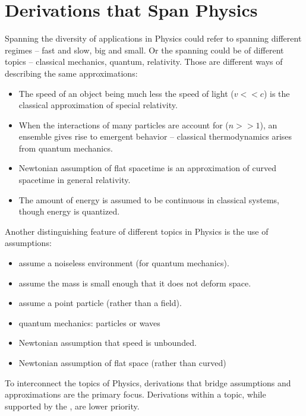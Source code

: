\section{Derivations that Span Physics\label{sec:span_physics}}

Spanning the diversity of applications in Physics  could refer to spanning different regimes -- fast and slow, big and small. Or the spanning could be of different topics -- classical mechanics, quantum, relativity. 
Those are different ways of describing the same approximations: 
\begin{itemize}
    \item The speed of an object being much less the speed of light ($v<<c$) is the classical approximation of special relativity.
    \item When the interactions of many particles are account for ($n>>1$), an ensemble gives rise to emergent behavior -- classical thermodynamics arises from quantum mechanics.
    \item Newtonian assumption of flat spacetime is an approximation of curved spacetime in general relativity.
    \item The amount of energy is assumed to be continuous in classical systems, though energy is quantized.
\end{itemize}
Another distinguishing feature of different topics in Physics is the use of assumptions:
\begin{itemize}
    \item assume a noiseless environment (for quantum mechanics).
    \item assume the mass is small enough that it does not deform space.
    \item assume a point particle (rather than a field).
    \item quantum mechanics: particles or waves
    \item Newtonian assumption that speed is unbounded.
    \item Newtonian assumption of flat space (rather than curved)
\end{itemize}

To interconnect the topics of Physics, derivations that bridge assumptions and approximations are the primary focus. Derivations within a topic, while supported by the \pdg{}, are lower priority.